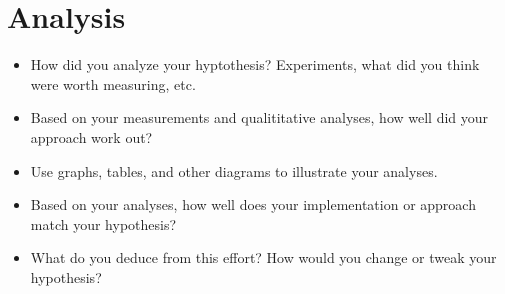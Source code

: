 \chapter{Analysis}


\begin{itemize}
\item{}  How did you analyze your hyptothesis? Experiments, what did you think were worth measuring, etc.
\item{}  Based on your measurements and qualititative analyses, how well did your approach work out?
\item{}  Use graphs, tables, and other diagrams to illustrate your analyses.
\item{}  Based on your analyses, how well does your implementation or approach match your hypothesis?
\item{}  What do you deduce from this effort? How would you change or tweak your hypothesis? 

\end{itemize}